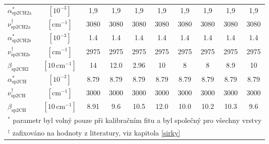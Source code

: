 \begin{tabular}{lccccccccc}
$\alpha_\mathrm{sp2CH2a} ^\ast$ & $[10^{-3}]$ & 1,9 & 1,9 & 1,9 & 1,9 & 1,9 & 1,9 & 1,9 & 1,9\\
$\nu_\mathrm{sp2CH2a} ^\dagger$ & $[\mathrm{cm}^{-1}]$ & 3080 & 3080 & 3080 & 3080 & 3080 & 3080 & 3080 & 3080\\
$\alpha_\mathrm{sp2CH2s} ^\ast$ & $[10^{-3}]$ & 1.4 & 1.4 & 1.4 & 1.4 & 1.4 & 1.4 & 1.4 & 1.4\\
$\nu_\mathrm{sp2CH2s} ^\dagger$ & $[\mathrm{cm}^{-1}]$ & 2975 & 2975 & 2975 & 2975 & 2975 & 2975 & 2975 & 2975\\
$\beta_\mathrm{sp2CH2}$ & $[10\,\mathrm{cm}^{-1}]$ & 14 & 12.0 & 2.96 & 10 & 8 & 8 & 8.9 & 10\\
$\alpha_\mathrm{sp2CH} ^\ast$ & $[10^{-3}]$ & 8.79 & 8.79 & 8.79 & 8.79 & 8.79 & 8.79 & 8.79 & 8.79\\
$\nu_\mathrm{sp2CH} ^\dagger$ & $[\mathrm{cm}^{-1}]$ & 3000 & 3000 & 3000 & 3000 & 3000 & 3000 & 3000 & 3000\\
$\beta_\mathrm{sp2CH}$ & $[10\,\mathrm{cm}^{-1}]$ & 8.91 & 9.6 & 10.5 & 12.0 & 10.0 & 10.2 & 10.3 & 9.6\\

\hline
\multicolumn{10}{l}{$^\ast$ parametr byl volný pouze při kalibračním fitu a byl společný pro všechny vrstvy}\\
\multicolumn{10}{l}{$^\dagger$ zafixováno na hodnoty z literatury, viz kapitola \ref{sirky}}\\
\end{tabular}
